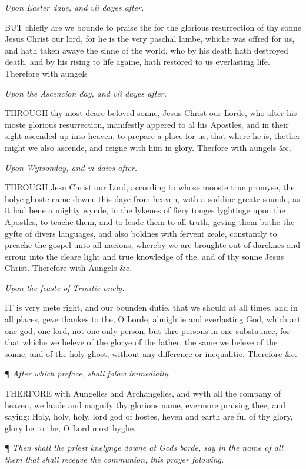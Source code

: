 \emph{Upon
Easter daye, and vii dayes after.}

BUT
chiefly are we bounde to praise the for the glorious resurrection of thy
sonne Jesus Christ our lord, for he is the very paschal lambe, whiche
was offred for us, and hath taken awaye the sinne of the world, who by
his death hath destroyed death, and by his rising to life againe, hath
restored to us everlasting life. Therefore with aungels

\emph{Upon
the Ascencion day, and vii dayes after.}

THROUGH
thy most deare beloved sonne, Jesus Christ our Lorde, who after his moste
glorious resurrection, manifestly appered to al his Apostles, and in their
sight ascended up into heaven, to prepare a place for us, that where he
is, thether might we also ascende, and reigne with him in glory. Therfore
with aungels \&c.

\emph{Upon
Wytsonday, and vi daies after.}

THROUGH
Jesu Christ our Lord, according to whose mooste true promyse, the holye
ghoste came downe this daye from heaven, with a soddine greate sounde,
as it had bene a mighty wynde, in the lykenes of fiery tonges lyghtinge
upon the Apostles, to teache them, and to leade them to all truth, geving
them bothe the gyfte of divers languages, and also boldnes with fervent
zeale, constantly to preache the gospel unto all nacions, whereby we are
broughte out of darcknes and errour into the cleare light and true knowledge
of the, and of thy sonne Jesus Christ. Therefore with Aungels \&c.

\emph{Upon
the feaste of Trinitie onely.}

IT
is very mete right, and our bounden dutie, that we should at all times,
and in all places, geve thankes to the, O Lorde, almightie and everlasting
God, which art one god, one lord, not one only person, but thre persons
in one substaunce, for that whiche we beleve of the glorye of the father,
the same we beleve of the sonne, and of the holy ghost, without any difference
or inequalitie. Therefore \&c.

¶
\emph{After which preface, shall folow immediatly}.

THERFORE
with Aungelles and Archangelles, and wyth all the company of heaven, we
laude and magnify thy glorious name, evermore praising thee, and saying:
Holy, holy, holy, lord god of hostes, heven and earth are ful of thy glory,
glory be to the, O Lord most hyghe.

¶
\emph{Then shall the priest knelynge downe at Gods borde, say in the name
of all them that shall receyve the communion, this prayer folowing.}

